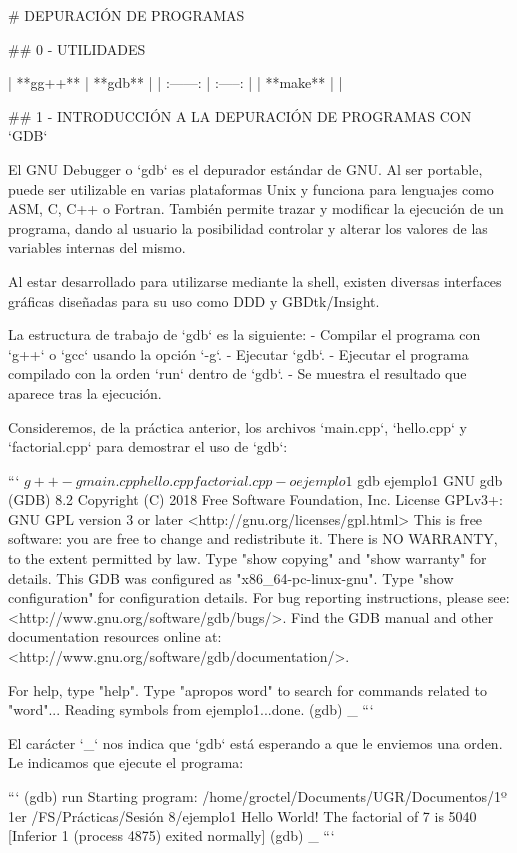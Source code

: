 # DEPURACIÓN DE PROGRAMAS

## 0 - UTILIDADES

| **gg++** | **gdb** |
| :------: | :-----: |
| **make** |         |

## 1 - INTRODUCCIÓN A LA DEPURACIÓN DE PROGRAMAS CON `GDB`

El GNU Debugger o `gdb` es el depurador estándar de GNU. Al ser portable, puede ser utilizable en varias plataformas Unix y funciona para lenguajes como ASM, C, C++ o Fortran. También permite trazar y modificar la ejecución de un programa, dando al usuario la posibilidad controlar y alterar los valores de las variables internas del mismo.

Al estar desarrollado para utilizarse mediante la shell, existen diversas interfaces gráficas diseñadas para su uso como DDD y GBDtk/Insight.

La estructura de trabajo de `gdb` es la siguiente:
- Compilar el programa con `g++` o `gcc` usando la opción `-g`.
- Ejecutar `gdb`.
- Ejecutar el programa compilado con la orden `run` dentro de `gdb`.
- Se muestra el resultado que aparece tras la ejecución.

Consideremos, de la práctica anterior, los archivos `main.cpp`, `hello.cpp` y `factorial.cpp` para demostrar el uso de `gdb`:

```
$ g++ -g main.cpp hello.cpp factorial.cpp -o ejemplo1
$ gdb ejemplo1
  GNU gdb (GDB) 8.2
  Copyright (C) 2018 Free Software Foundation, Inc.
  License GPLv3+: GNU GPL version 3 or later <http://gnu.org/licenses/gpl.html>
  This is free software: you are free to change and redistribute it.
  There is NO WARRANTY, to the extent permitted by law.
  Type "show copying" and "show warranty" for details.
  This GDB was configured as "x86_64-pc-linux-gnu".
  Type "show configuration" for configuration details.
  For bug reporting instructions, please see:
  <http://www.gnu.org/software/gdb/bugs/>.
  Find the GDB manual and other documentation resources online at:
      <http://www.gnu.org/software/gdb/documentation/>.

  For help, type "help".
  Type "apropos word" to search for commands related to "word"...
  Reading symbols from ejemplo1...done.
  (gdb) _
```

El carácter `_` nos indica que `gdb` está esperando a que le enviemos una orden. Le indicamos que ejecute el programa:

```
  (gdb) run
  Starting program: /home/groctel/Documents/UGR/Documentos/1º 1er /FS/Prácticas/Sesión 8/ejemplo1 
  Hello World!
  The factorial of 7 is 5040
  [Inferior 1 (process 4875) exited normally]
  (gdb) _
```

